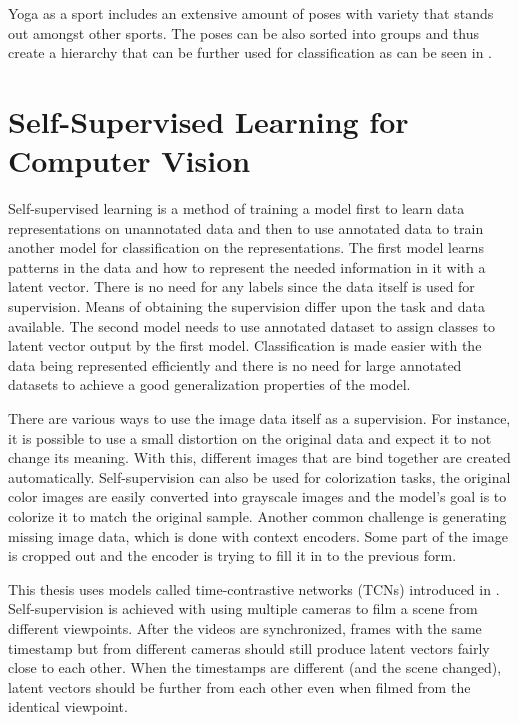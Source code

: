 Yoga as a sport includes an extensive amount of poses with variety that stands out amongst other sports. The poses can be also sorted into groups and thus create a hierarchy that can be further used for classification as can be seen in \cite{verma2020yoga}.

\section{\label{sec:self-supervised}Self-Supervised Learning for Computer Vision}

Self-supervised learning is a method of training a model first to learn data representations on unannotated data and then to use annotated data to train another model for classification on the representations. The first model learns patterns in the data and how to represent the needed information in it with a latent vector. There is no need for any labels since the data itself is used for supervision. Means of obtaining the supervision differ upon the task and data available. The second model needs to use annotated dataset to assign classes to latent vector output by the first model. Classification is made easier with the data being represented efficiently and there is no need for large annotated datasets to achieve a good generalization properties of the model.

There are various ways to use the image data itself as a supervision. For instance, it is possible to use a small distortion on the original data and expect it to not change its meaning. With this, different images that are bind together are created automatically. Self-supervision can also be used for colorization tasks, the original color images are easily converted into grayscale images and the model's goal is to colorize it to match the original sample. Another common challenge is generating missing image data, which is done with context encoders. Some part of the image is cropped out and the encoder is trying to fill it in to the previous form.

This thesis uses models called time-contrastive networks (TCNs) introduced in \cite{sermanet2018timecontrastive}. Self-supervision is achieved with using multiple cameras to film a scene from different viewpoints. After the videos are synchronized, frames with the same timestamp but from different cameras should still produce latent vectors fairly close to each other. When the timestamps are different (and the scene changed), latent vectors should be further from each other even when filmed from the identical viewpoint.

